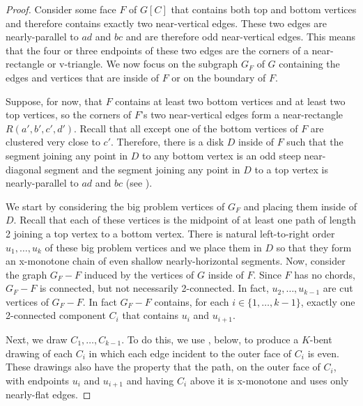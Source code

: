 \documentclass{patmorin}
\begin{document}
\begin{proof}
  Consider some face $F$ of $G[C]$ that contains both top and bottom
  vertices and therefore contains exactly two near-vertical edges.
  These two edges are nearly-parallel to $ad$ and $bc$ and are therefore
  odd near-vertical edges.  This means that the four or three endpoints
  of these two edges are the corners of a near-rectangle or v-triangle.
  We now focus on the subgraph $G_F$ of $G$ containing the edges and
  vertices that are inside of $F$ or on the boundary of $F$.

  Suppose, for now, that $F$ contains at least two bottom vertices and
  at least two top vertices, so the corners of $F$'s two near-vertical
  edges form a near-rectangle $R(a',b',c',d')$.  Recall that all
  except one of the bottom vertices of $F$ are clustered very close
  to $c'$.  Therefore, there is a disk $D$ inside of $F$ such that the
  segment joining any point in $D$ to any bottom vertex is an odd steep
  near-diagonal segment and the segment joining any point in $D$ to a
  top vertex is nearly-parallel to $ad$ and $bc$ (see ).

  We start by considering the big problem vertices of $G_F$ and placing
  them inside of $D$.  Recall that each of these vertices is the
  midpoint of at least one path of length 2 joining a top vertex to a
  bottom vertex. There is natural left-to-right order $u_1,\ldots,u_k$
  of these big problem vertices and we place them in $D$ so that they
  form an x-monotone chain of even shallow nearly-horizontal segments.  Now,
  consider the graph $G_F-F$ induced by the vertices of $G$ inside of $F$.
  Since $F$ has no chords, $G_F-F$ is connected, but not necessarily
  2-connected. In fact, $u_2,\ldots,u_{k-1}$ are cut vertices of $G_F-F$.
  In fact $G_F-F$ contains, for each $i\in\{1,\ldots,k-1\}$, exactly
  one 2-connected component $C_i$ that contains $u_i$ and $u_{i+1}$.

  Next, we draw $C_1,\ldots,C_{k-1}$.  To do this, we use ,
  below, to produce a $K$-bent drawing of each $C_i$ in which each edge
  incident to the outer face of $C_i$ is even.  These drawings also have
  the property that the path, on the outer face of $C_i$, with endpoints
  $u_i$ and $u_{i+1}$ and having $C_i$ above it is x-monotone and uses
  only nearly-flat edges.


\end{proof}
\end{document}
